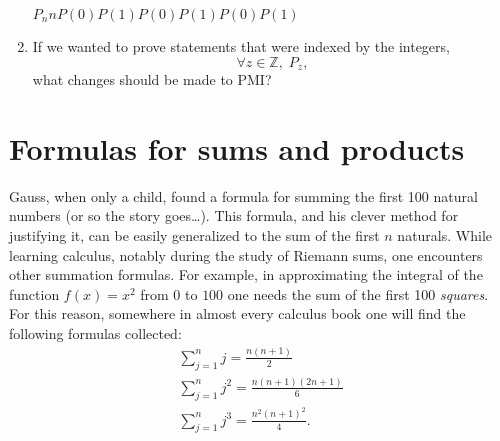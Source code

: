 \documentclass[10pt,]{book}
\theoremstyle{plain}
\theoremstyle{definition}
\theoremstyle{definition}
\numberwithin{equation}{section}
\newcommand{\hint}[1]{ }
\newcommand{\Integers}{{\mathbb Z}}
\begin{document}
\begin{enumerate}[label=(\alph*)]
\(P_n\)\(n\)\(P(0)\)\(P(1)\)\(P(0)\)\(P(1)\)\(P(0)\)\(P(1)\)\item\hypertarget{li-369}{}
        If we wanted to prove statements that were indexed by the integers,
        \begin{equation*}
          \forall z \in \Integers, \; P_z,
        \end{equation*}
        what changes should be made to PMI?

        \hint{A quick change would be to replace \(\forall k, \; P_k \implies P_{k+1}\) in the inductive
        step with \(\forall k, \; P_k \iff P_{k+1}\).  While this would do the trick, a slight improvement 
        is possible, if we treat the positive and negative cases for \(k\) separately.}
\end{enumerate}
\typeout{************************************************}
\typeout{************************************************}
\section[{Formulas for sums and products}]{Formulas for sums and products}\label{section-27}

    Gauss, when only a child, found a formula for
    summing the first 100 natural numbers (or so the story goes\dots{}).
    This formula, and his clever method for justifying it, can be easily
    generalized to the sum of the first \(n\) naturals.
    While learning calculus, notably during the study of Riemann sums,
    one encounters other summation formulas. For example, in approximating the
    integral of the function \(f(x)=x^2\) from \(0\) to \(100\) one needs the sum of
    the first 100 \emph{squares}. For this reason, somewhere in almost
    every calculus book one will find the following formulas collected:
    \begin{gather*}
\sum_{j=1}^n j = \frac{n(n+1)}{2}\\
\sum_{j=1}^n j^2 = \frac{n(n+1)(2n+1)}{6}\\
\sum_{j=1}^n j^3 = \frac{n^2(n+1)^2}{4}.
\end{gather*}
\par
\end{document}
